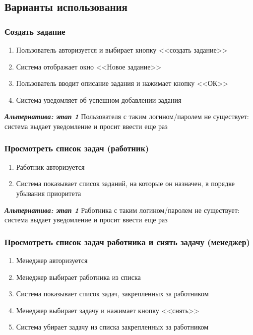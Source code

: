 \subsection{Варианты использования}
	\subsubsection{Создать задание}
	\begin{enumerate}
		\item 	Пользователь авторизуется и выбирает кнопку <<создать задание>>
		\item 	Система отображает окно <<Новое задание>>
		\item 	Пользователь вводит описание задания и нажимает кнопку <<ОК>>
		\item 	Система уведомляет об успешном добавлении задания
	\end{enumerate}
	
	\textbf{\textit{Альтернатива: этап 1}} Пользователя с таким логином/паролем не существует: система выдает уведомление и просит ввести еще раз
	
	\subsubsection{Просмотреть список задач (работник)}
	\begin{enumerate}
		\item	Работник авторизуется
		\item	Система показывает список заданий, на которые он назначен, в порядке убывания приоритета		
	\end{enumerate}
		\textbf{\textit{Альтернатива: этап 1}} Работника с таким логином/паролем не существует: система выдает уведомление и просит ввести еще раз
			
	\subsubsection{Просмотреть список задач работника и снять задачу (менеджер)}
		\begin{enumerate}
		\item	Менеджер авторизуется
		\item	Менеджер выбирает работника из списка
		\item	Система показывает список задач, закрепленных за работником
		\item	Менеджер выбирает задачу и нажимает кнопку <<снять>>
		\item	Система убирает задачу из списка закрепленных за работником		
		\end{enumerate}
		
